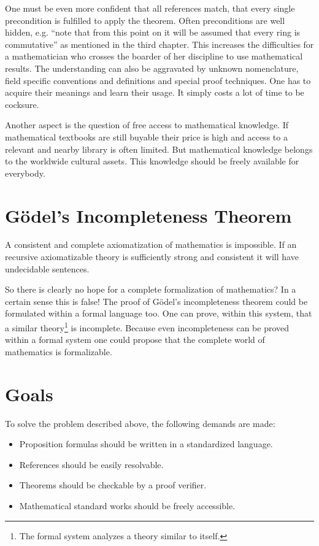 \documentclass[a4paper,german,10pt,twoside]{book}
\theoremstyle{definition}
\theoremstyle{remark}
\begin{document}
\par
One must be even more confident that all references match, that every single precondition is fulfilled to apply the theorem. Often preconditions are well hidden, e.g. ``note that from this point on it will be assumed that every ring is commutative'' as mentioned in the third chapter. This increases the difficulties for a mathematician who crosses the boarder of her discipline to use mathematical results. The understanding can also be aggravated by unknown nomenclature, field specific conventions and definitions and special proof techniques. One has to acquire their meanings and learn their usage. It simply costs a lot of time to be cocksure.

\par
{}Another aspect is the question of free access to mathematical knowledge. If mathematical textbooks are still buyable their price is high and access to a relevant and nearby library is often limited. But mathematical knowledge belongs to the worldwide cultural assets. This knowledge should be freely available for everybody.

\section{G{\"o}del's Incompleteness Theorem} \label{chapter2_section1} \hypertarget{chapter2_section1}{}
A consistent and complete axiomatization of mathematics is impossible. If an recursive axiomatizable theory is sufficiently strong and consistent it will have undecidable sentences.

\par
So there is clearly no hope for a complete formalization of mathematics? In a certain sense this is false! The proof of G{\"o}del's incompleteness theorem could be formulated within a formal language too. One can prove, within this system, that a similar theory\footnote{The formal system analyzes a theory similar to itself.} is incomplete. Because even incompleteness can be proved within a formal system one could propose that the complete world of mathematics is formalizable.

\section{Goals} \label{chapter2_section2} \hypertarget{chapter2_section2}{}
To solve the problem described above, the following demands are made:

\begin{itemize}
\item
Proposition formulas should be written in a standardized language.
\item
References should be easily resolvable.
\item
Theorems should be checkable by a proof verifier.
\item
Mathematical standard works should be freely accessible.
\end{itemize}
\end{document}
